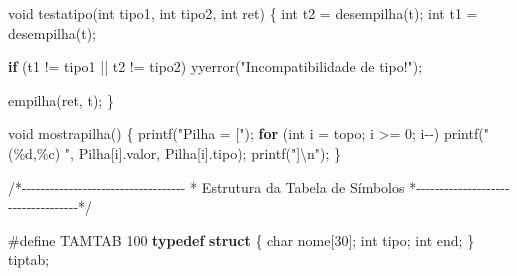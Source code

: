 \documentclass[
  brazilian,
  letterpaper,
]{book}
\newenvironment{Shaded}{\begin{snugshade}}{\end{snugshade}}
\newcommand{\CharTok}[1]{\textcolor[rgb]{0.13,0.47,0.30}{#1}}
\newcommand{\CommentTok}[1]{\textcolor[rgb]{0.37,0.37,0.37}{#1}}
\newcommand{\ControlFlowTok}[1]{\textcolor[rgb]{0.00,0.23,0.31}{\textbf{#1}}}
\newcommand{\DataTypeTok}[1]{\textcolor[rgb]{0.68,0.00,0.00}{#1}}
\newcommand{\DecValTok}[1]{\textcolor[rgb]{0.68,0.00,0.00}{#1}}
\newcommand{\KeywordTok}[1]{\textcolor[rgb]{0.00,0.23,0.31}{\textbf{#1}}}
\newcommand{\NormalTok}[1]{\textcolor[rgb]{0.00,0.23,0.31}{#1}}
\newcommand{\OperatorTok}[1]{\textcolor[rgb]{0.37,0.37,0.37}{#1}}
\newcommand{\PreprocessorTok}[1]{\textcolor[rgb]{0.68,0.00,0.00}{#1}}
\newcommand{\SpecialCharTok}[1]{\textcolor[rgb]{0.37,0.37,0.37}{#1}}
\newcommand{\StringTok}[1]{\textcolor[rgb]{0.13,0.47,0.30}{#1}}
\theoremstyle{plain}
\theoremstyle{definition}
\theoremstyle{remark}
\begin{document}
\begin{Shaded}
\begin{Highlighting}[]
\DataTypeTok{void}\NormalTok{ testatipo}\OperatorTok{(}\DataTypeTok{int}\NormalTok{ tipo1}\OperatorTok{,} \DataTypeTok{int}\NormalTok{ tipo2}\OperatorTok{,} \DataTypeTok{int}\NormalTok{ ret}\OperatorTok{)}
\OperatorTok{\{}
    \DataTypeTok{int}\NormalTok{ t2 }\OperatorTok{=}\NormalTok{ desempilha}\OperatorTok{(}\CharTok{\textquotesingle{}t\textquotesingle{}}\OperatorTok{);}
    \DataTypeTok{int}\NormalTok{ t1 }\OperatorTok{=}\NormalTok{ desempilha}\OperatorTok{(}\CharTok{\textquotesingle{}t\textquotesingle{}}\OperatorTok{);}

    \ControlFlowTok{if} \OperatorTok{(}\NormalTok{t1 }\OperatorTok{!=}\NormalTok{ tipo1 }\OperatorTok{||}\NormalTok{ t2 }\OperatorTok{!=}\NormalTok{ tipo2}\OperatorTok{)}
\NormalTok{        yyerror}\OperatorTok{(}\StringTok{"Incompatibilidade de tipo!"}\OperatorTok{);}

\NormalTok{    empilha}\OperatorTok{(}\NormalTok{ret}\OperatorTok{,} \CharTok{\textquotesingle{}t\textquotesingle{}}\OperatorTok{);}
\OperatorTok{\}}

\DataTypeTok{void}\NormalTok{ mostrapilha}\OperatorTok{()}
\OperatorTok{\{}
\NormalTok{    printf}\OperatorTok{(}\StringTok{"Pilha = ["}\OperatorTok{);}
    \ControlFlowTok{for} \OperatorTok{(}\DataTypeTok{int}\NormalTok{ i }\OperatorTok{=}\NormalTok{ topo}\OperatorTok{;}\NormalTok{ i }\OperatorTok{\textgreater{}=} \DecValTok{0}\OperatorTok{;}\NormalTok{ i}\OperatorTok{{-}{-})}
\NormalTok{        printf}\OperatorTok{(}\StringTok{"(}\SpecialCharTok{\%d}\StringTok{,}\SpecialCharTok{\%c}\StringTok{) "}\OperatorTok{,}\NormalTok{ Pilha}\OperatorTok{[}\NormalTok{i}\OperatorTok{].}\NormalTok{valor}\OperatorTok{,}\NormalTok{ Pilha}\OperatorTok{[}\NormalTok{i}\OperatorTok{].}\NormalTok{tipo}\OperatorTok{);}
\NormalTok{    printf}\OperatorTok{(}\StringTok{"]}\SpecialCharTok{\textbackslash{}n}\StringTok{"}\OperatorTok{);}
\OperatorTok{\}}

\CommentTok{/*{-}{-}{-}{-}{-}{-}{-}{-}{-}{-}{-}{-}{-}{-}{-}{-}{-}{-}{-}{-}{-}{-}{-}{-}{-}{-}{-}{-}{-}{-}{-}{-}{-}{-}{-}}
\CommentTok{ * Estrutura da Tabela de Símbolos}
\CommentTok{ *{-}{-}{-}{-}{-}{-}{-}{-}{-}{-}{-}{-}{-}{-}{-}{-}{-}{-}{-}{-}{-}{-}{-}{-}{-}{-}{-}{-}{-}{-}{-}{-}{-}{-}{-}*/}

\PreprocessorTok{\#define TAMTAB }\DecValTok{100}
\KeywordTok{typedef} \KeywordTok{struct}
\OperatorTok{\{}
    \DataTypeTok{char}\NormalTok{ nome}\OperatorTok{[}\DecValTok{30}\OperatorTok{];}
    \DataTypeTok{int}\NormalTok{ tipo}\OperatorTok{;}
    \DataTypeTok{int}\NormalTok{ end}\OperatorTok{;}
\OperatorTok{\}}\NormalTok{ tiptab}\OperatorTok{;}


\end{Highlighting}
\end{Shaded}
\end{document}
